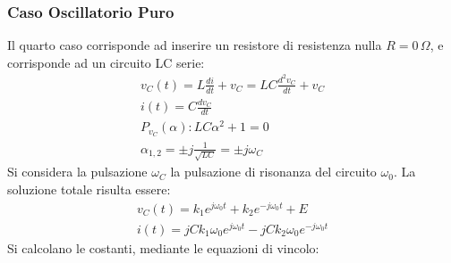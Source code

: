 \documentclass{article}
\numberwithin{equation}{subsection}
\begin{document}
\subsubsection{Caso Oscillatorio Puro}

Il quarto caso corrisponde ad inserire un resistore di resistenza nulla $R=0\,\Omega$, e corrisponde ad un circuito LC serie:
\begin{gather*}
    v_C(t)=L\displaystyle\frac{di}{dt}+v_C=LC\frac{d^2v_C}{dt}+v_C\\
    i(t)=C\displaystyle\frac{dv_C}{dt}\\
    P_{v_C}(\alpha):LC\alpha^2+1=0\\
    \alpha_{1,2}=\displaystyle\pm j\frac{1}{\sqrt{LC}}=\pm j\omega_C
\end{gather*}
Si considera la pulsazione $\omega_C$ la pulsazione di risonanza del circuito $\omega_0$. 
La soluzione totale risulta essere:
\begin{gather*}
    v_C(t)=k_1e^{j\omega_0t}+k_2e^{-j\omega_0t}+E\\
    i(t)=jCk_1\omega_0e^{j\omega_0t}-jCk_2\omega_0e^{-j\omega_0t}
\end{gather*}
Si calcolano le costanti, mediante le equazioni di vincolo:
\end{document}
